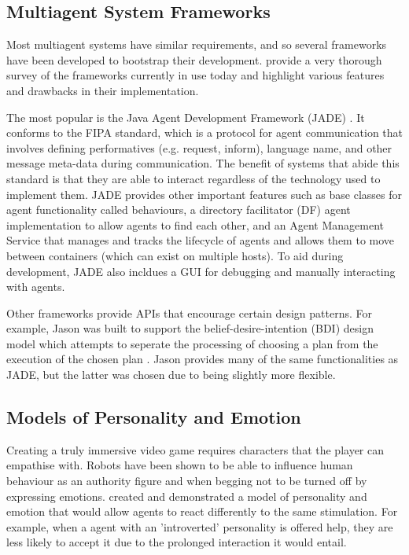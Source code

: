 \documentclass{article}
\begin{document}
\subsection{Multiagent System Frameworks}

Most multiagent systems have similar requirements, and so several frameworks have been developed to bootstrap their development. \cite{massurvey} provide a very thorough survey of the frameworks currently in use today and highlight various features and drawbacks in their implementation. 

The most popular is the Java Agent Development Framework (JADE) \cite{jade}. It conforms to the FIPA standard, which is a protocol for agent communication that involves defining performatives (e.g. request, inform), language name, and other message meta-data during communication. The benefit of systems that abide this standard is that they are able to interact regardless of the technology used to implement them. JADE provides other important features such as base classes for agent functionality called behaviours, a directory facilitator (DF) agent implementation to allow agents to find each other, and an Agent Management Service that manages and tracks the lifecycle of agents and allows them to move between containers (which can exist on multiple hosts). To aid during development, JADE also incldues a GUI for debugging and manually interacting with agents.

Other frameworks provide APIs that encourage certain design patterns. For example, Jason was built to support the belief-desire-intention (BDI) design model which attempts to seperate the processing of choosing a plan from the execution of the chosen plan \cite{jason}. Jason provides many of the same functionalities as JADE, but the latter was chosen due to being slightly more flexible.

\subsection{Models of Personality and Emotion}

Creating a truly immersive video game requires characters that the player can empathise with. Robots have been shown to be able to influence human behaviour as an authority figure \cite{bossrobot} and when begging not to be turned off \cite{turnoffrobot} by expressing emotions. \cite{personalitymodel} created and demonstrated a model of personality and emotion that would allow agents to react differently to the same stimulation. For example, when a agent with an 'introverted' personality is offered help, they are less likely to accept it due to the prolonged interaction it would entail. 
\end{document}
